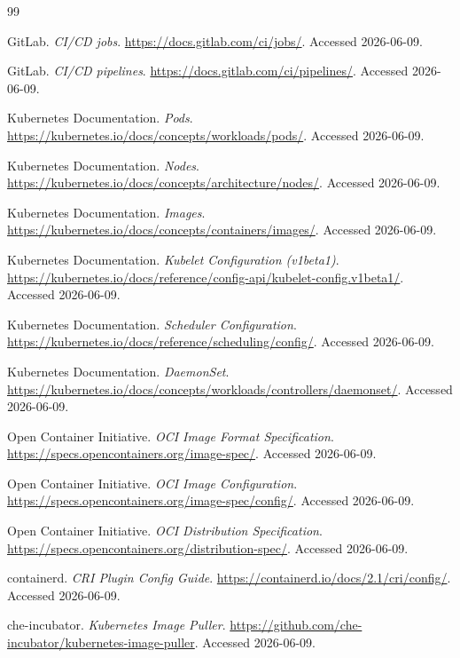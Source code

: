 \documentclass[11pt,a4paper]{article}
\begin{document}
\begin{thebibliography}{99}

GitLab. \emph{CI/CD jobs}. \url{https://docs.gitlab.com/ci/jobs/}. Accessed 2026-06-09.

GitLab. \emph{CI/CD pipelines}. \url{https://docs.gitlab.com/ci/pipelines/}. Accessed 2026-06-09.

Kubernetes Documentation. \emph{Pods}. \url{https://kubernetes.io/docs/concepts/workloads/pods/}. Accessed 2026-06-09.

Kubernetes Documentation. \emph{Nodes}. \url{https://kubernetes.io/docs/concepts/architecture/nodes/}. Accessed 2026-06-09.

Kubernetes Documentation. \emph{Images}. \url{https://kubernetes.io/docs/concepts/containers/images/}. Accessed 2026-06-09.

Kubernetes Documentation. \emph{Kubelet Configuration (v1beta1)}. \url{https://kubernetes.io/docs/reference/config-api/kubelet-config.v1beta1/}. Accessed 2026-06-09.

Kubernetes Documentation. \emph{Scheduler Configuration}. \url{https://kubernetes.io/docs/reference/scheduling/config/}. Accessed 2026-06-09.

Kubernetes Documentation. \emph{DaemonSet}. \url{https://kubernetes.io/docs/concepts/workloads/controllers/daemonset/}. Accessed 2026-06-09.

Open Container Initiative. \emph{OCI Image Format Specification}. \url{https://specs.opencontainers.org/image-spec/}. Accessed 2026-06-09.

Open Container Initiative. \emph{OCI Image Configuration}. \url{https://specs.opencontainers.org/image-spec/config/}. Accessed 2026-06-09.

Open Container Initiative. \emph{OCI Distribution Specification}. \url{https://specs.opencontainers.org/distribution-spec/}. Accessed 2026-06-09.

containerd. \emph{CRI Plugin Config Guide}. \url{https://containerd.io/docs/2.1/cri/config/}. Accessed 2026-06-09.

che-incubator. \emph{Kubernetes Image Puller}. \url{https://github.com/che-incubator/kubernetes-image-puller}. Accessed 2026-06-09.


\end{thebibliography}
\end{document}
